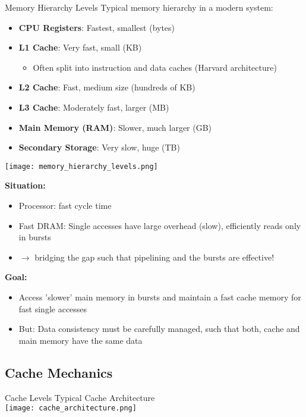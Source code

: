 \begin{definition}{Memory Hierarchy Levels}
Typical memory hierarchy in a modern system:
\begin{itemize}
    \item \textbf{CPU Registers}: Fastest, smallest (bytes)
    \item \textbf{L1 Cache}: Very fast, small (KB)
    \begin{itemize}
        \item Often split into instruction and data caches (Harvard architecture)
    \end{itemize}
    \item \textbf{L2 Cache}: Fast, medium size (hundreds of KB)
    \item \textbf{L3 Cache}: Moderately fast, larger (MB)
    \item \textbf{Main Memory (RAM)}: Slower, much larger (GB)
    \item \textbf{Secondary Storage}: Very slow, huge (TB)
\end{itemize}
\texttt{[image: memory\_hierarchy\_levels.png]}
\end{definition}

\begin{remark}
    \textbf{Situation:}
    \begin{itemize}
        \item Processor: fast cycle time
        \item Fast DRAM: Single accesses have large overhead (slow), efficiently reads only in bursts
        \item $\rightarrow$ bridging the gap such that pipelining and the bursts are effective!
    \end{itemize}
\textbf{Goal:}
\begin{itemize}
    \item Access 'slower' main memory in bursts and maintain a fast cache memory for fast single accesses
    \item But: Data consistency must be carefully managed, such that both, cache and main memory have the same data
\end{itemize}
\end{remark}

\subsection{Cache Mechanics}

\begin{definition}{Cache Levels} Typical Cache Architecture\\
    \texttt{[image: cache\_architecture.png]}    
\end{definition}


